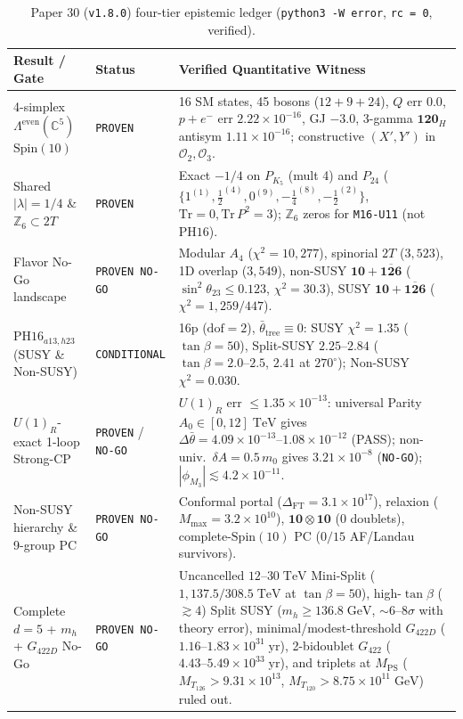 \documentclass[11pt,a4paper]{article}
\begin{document}
\begin{table}[t!]
\centering
\caption{Paper 30 (\texttt{v1.8.0}) four-tier epistemic ledger (\texttt{python3 -W error}, \texttt{rc = 0}, verified).}
\label{tab:ledger}
\scriptsize
\begin{tabular}{p{3.9cm}p{2.0cm}p{9.2cm}}
\toprule
Result / Gate & Status & Verified Quantitative Witness \\
\midrule
4-simplex $\Lambda^{\mathrm{even}}(\mathbb{C}^5)$ $\mathrm{Spin}(10)$ & \texttt{PROVEN} & 16 SM states, 45 bosons ($12+9+24$), $Q$ err $0.0$, $p+e^-$ err $2.22\times 10^{-16}$, GJ $-3.0$, 3-gamma $\mathbf{120}_H$ antisym $1.11\times 10^{-16}$; constructive $(X',Y')$ in $\mathcal{O}_2,\mathcal{O}_3$. \\
Shared $|\lambda|=1/4$ \& $\mathbb{Z}_6\subset 2T$ & \texttt{PROVEN} & Exact $-1/4$ on $P_{K_5}$ (mult 4) and $P_{24}$ ($\{1^{(1)},\tfrac{1}{2}^{(4)},0^{(9)},-\tfrac{1}{4}^{(8)},-\tfrac{1}{2}^{(2)}\}$, $\mathrm{Tr}=0,\mathrm{Tr}\,P^2=3$); $\mathbb{Z}_6$ zeros for \texttt{M16-U11} (not $\mathrm{PH16}$). \\
Flavor No-Go landscape & \texttt{PROVEN NO-GO} & Modular $A_4$ ($\chi^2=10{,}277$), spinorial $2T$ ($3{,}523$), 1D overlap ($3{,}549$), non-SUSY $\mathbf{10}+\overline{\mathbf{126}}$ ($\sin^2\theta_{23}\le 0.123$, $\chi^2=30.3$), SUSY $\mathbf{10}+\overline{\mathbf{126}}$ ($\chi^2=1{,}259/447$). \\
$\mathrm{PH16}_{a13,h23}$ (SUSY \& Non-SUSY) & \texttt{CONDITIONAL} & 16p ($\mathrm{dof}=2$), $\bar\theta_{\mathrm{tree}}\equiv 0$: SUSY $\chi^2=1.35$ ($\tan\beta=50$), Split-SUSY $2.25\text{--}2.84$ ($\tan\beta=2.0\text{--}2.5$, $2.41$ at $270^\circ$); Non-SUSY $\chi^2=0.030$. \\
$U(1)_R$-exact 1-loop Strong-CP & \texttt{PROVEN} / \texttt{NO-GO} & $U(1)_R$ err $\le 1.35\times 10^{-13}$: universal Parity $A_0\in[0,12]\;\mathrm{TeV}$ gives $\Delta\bar\theta = 4.09\times 10^{-13}\text{--}1.08\times 10^{-12}$ (PASS); non-univ.\ $\delta A=0.5\,m_0$ gives $3.21\times 10^{-8}$ (\texttt{NO-GO}); $|\phi_{M_3}|\lesssim 4.2\times 10^{-11}$. \\
Non-SUSY hierarchy \& 9-group PC & \texttt{PROVEN NO-GO} & Conformal portal ($\Delta_{\mathrm{FT}}=3.1\times 10^{17}$), relaxion ($M_{\max}=3.2\times 10^{10}$), $\mathbf{10}\otimes\mathbf{10}$ (0 doublets), complete-$\mathrm{Spin}(10)$ PC ($0/15$ AF/Landau survivors). \\
Complete $d=5$ + $m_h$ + $G_{422D}$ No-Go & \texttt{PROVEN NO-GO} & Uncancelled $12\text{--}30\;\mathrm{TeV}$ Mini-Split ($1{,}137.5 / 308.5\;\mathrm{TeV}$ at $\tan\beta=50$), high-$\tan\beta$ ($\gtrsim 4$) Split SUSY ($m_h\ge 136.8\;\mathrm{GeV}$, $\sim 6\text{--}8\sigma$ with theory error), minimal/modest-threshold $G_{422D}$ ($1.16\text{--}1.83\times 10^{31}\;\mathrm{yr}$), 2-bidoublet $G_{422}$ ($4.43\text{--}5.49\times 10^{33}\;\mathrm{yr}$), and triplets at $M_{\mathrm{PS}}$ ($M_{T_{126}}>9.31\times 10^{13}$, $M_{T_{120}}>8.75\times 10^{11}\;\mathrm{GeV}$) ruled out. \\

\end{tabular}
\end{table}
\end{document}
